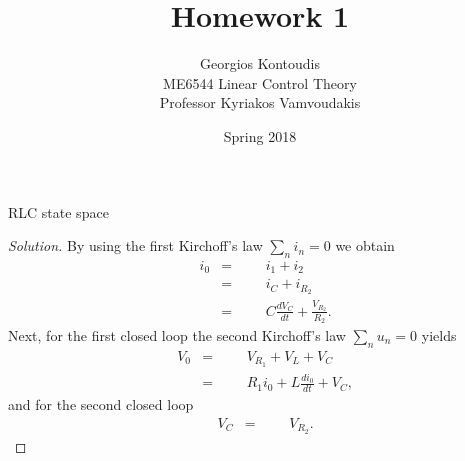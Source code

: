 \documentclass[12pt]{article}
\newenvironment{problem}[2][Problem]{\begin{trivlist}
\item[\hskip \labelsep {\bfseries #1}\hskip \labelsep {\bfseries #2.}]}{\end{trivlist}}
\newenvironment{solution}{\begin{proof}[Solution]}{\end{proof}}
\begin{document}
 
 
\title{Homework 1}
\author{Georgios Kontoudis\\ 
ME6544 Linear Control Theory\\
Professor Kyriakos Vamvoudakis} 
\date{Spring 2018}
 
\maketitle
\begin{problem}{1.1.1} %
RLC state space
\end{problem}
\begin{solution}

By using the first Kirchoff's law $\sum_n i_n= 0$ we obtain 
\begin{equation}\label{eq_KVL}
\begin{aligned}
& i_0
& =
&&& i_1+i_2\\
&& =
&&& i_C+i_{R_2}\\
&& =
&&& C \frac{dV_C}{dt}+\frac{V_{R_2}}{R_2}.
\end{aligned}
\end{equation}
Next, for the first closed loop the second Kirchoff's law $\sum_n u_n= 0$  yields
\begin{equation}\label{eq_KIL1}
\begin{aligned}
& V_0
& =
&&& V_{R_1}+V_L+V_C\\
&& =
&&& R_1i_0+L\frac{di_0}{dt}+V_C,
\end{aligned}
\end{equation}
and for the second closed loop
\begin{equation}\label{eq_KVL2}
\begin{aligned}
& V_C
& =
&&& V_{R_2}.
\end{aligned}
\end{equation}


\end{solution}
\end{document}
